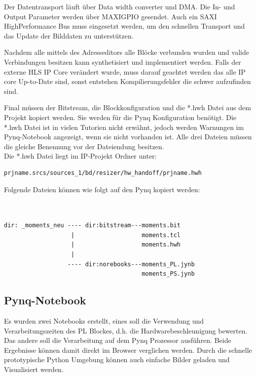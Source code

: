 \documentclass[a4paper]{report}
\begin{document}
Der Datentransport läuft über Data width converter und DMA. Die In- und Output Parameter werden über MAXIGPIO gesendet. Auch ein SAXI HighPerformance Bus muss eingesetzt werden, um den schnellen Transport und das Update der Bilddaten zu unterstützen. 

Nachdem alle mittels des Adresseditors alle Blöcke verbunden wurden und valide Verbindungen besitzen kann synthetisiert und implementiert werden. Falls der externe HLS IP Core verändert wurde, muss darauf geachtet werden das alle IP core Up-to-Date sind, sonst entstehen Kompilierungsfehler die schwer aufzufinden sind. 

Final müssen der Bitstream, die Blockkonfiguration und die *.hwh Datei aus dem Projekt kopiert werden. Sie werden für die Pynq Konfiguration benötigt. Die *.hwh Datei ist in vielen Tutorien nicht erwähnt, jedoch werden Warnungen im Pynq-Notebook angezeigt, wenn sie nicht vorhanden ist. Alle drei Dateien müssen die gleiche Benennung vor der Dateiendung besitzen.\\

Die *.hwh Datei liegt im IP-Projekt Ordner unter: 

\begin{verbatim}
prjname.srcs/sources_1/bd/resizer/hw_handoff/prjname.hwh
\end{verbatim}

Folgende Dateien können wie folgt auf den Pynq kopiert werden:

\begin{verbatim}


dir: _moments_neu ---- dir:bitstream---moments.bit
                   |                   moments.tcl
                   |                   moments.hwh
                   |
                  ---- dir:norebooks---moments_PL.jynb
                                       moments_PS.jynb
\end{verbatim}

\subsection{Pynq-Notebook}
Es wurden zwei Notebooks erstellt, eines soll die Verwendung und Verarbeitungszeiten des PL Blockes, d.h. die Hardwarebeschleunigung bewerten. Das andere soll die Verarbeitung auf dem Pynq Prozessor ausführen. Beide Ergebnisse können damit direkt im Browser verglichen werden. Durch die schnelle prototypische Python Umgebung können auch einfache Bilder geladen und Visualisiert werden.
\end{document}
